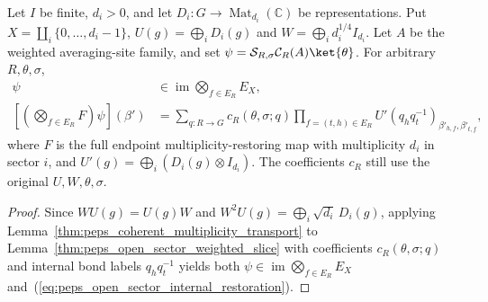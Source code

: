 \begin{lemma}%
    \label{thm:peps_open_sector_internal_restoration}
    \leanok
    Let $I$ be finite, $d_i>0$, and let
    $D_i:G\to\operatorname{Mat}_{d_i}(\mathbb C)$ be representations.
    Put $X=\coprod_i\{0,\ldots,d_i-1\}$,
    $U(g)=\bigoplus_iD_i(g)$ and $W=\bigoplus_i d_i^{1/4}I_{d_i}$.
    Let $A$ be the weighted averaging-site family, and set
    $\psi=\mathcal S_{R,\sigma}\mathcal C_R(A)\ket{\theta}$.
    For arbitrary $R,\theta,\sigma$,
    \begin{align}
        \psi & \in\operatorname{im}\bigotimes_{f\in E_R}E_X, \\
        \left[\left(\bigotimes_{f\in E_R}F\right)\psi\right](\beta')
             & =\sum_{q:R\to G}c_R(\theta,\sigma;q)
        \prod_{f=(t,h)\in E_R}
        U'(q_hq_t^{-1})_{\beta'_{h,f},\beta'_{t,f}},
        \label{eq:peps_open_sector_internal_restoration}
    \end{align}
    where $F$ is the full endpoint multiplicity-restoring map with
    multiplicity $d_i$ in sector $i$, and
    $U'(g)=\bigoplus_i(D_i(g)\otimes I_{d_i})$.
    The coefficients $c_R$ still use the original $U,W,\theta,\sigma$.
\end{lemma}
\begin{proof}\leanok
    Since $WU(g)=U(g)W$ and $W^2U(g)=\bigoplus_i\sqrt{d_i}\,D_i(g)$, applying
    Lemma~\ref{thm:peps_coherent_multiplicity_transport} to
    Lemma~\ref{thm:peps_open_sector_weighted_slice} with coefficients
    $c_R(\theta,\sigma;q)$ and internal bond labels $q_hq_t^{-1}$ yields both
    $\psi\in\operatorname{im}\bigotimes_{f\in E_R}E_X$ and~(\ref{eq:peps_open_sector_internal_restoration}).
\end{proof}


